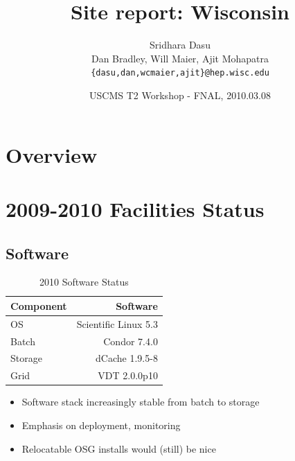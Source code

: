 \documentclass{beamer}
\title{Site report: Wisconsin}
\author[Maier]{
	Sridhara Dasu \\
	Dan Bradley, Will Maier, Ajit Mohapatra
	{\tt \{dasu,dan,wcmaier,ajit\}@hep.wisc.edu}}
\institute[Wisconsin]{University of Wisconsin - High Energy Physics}
\date[2010.03.08]{USCMS T2 Workshop - FNAL, 2010.03.08}
\begin{document}

\begin{frame}
	\titlepage
\end{frame}

\section{Overview}
\begin{frame}
	\tableofcontents
\end{frame}

\section{2009-2010 Facilities Status}
\subsection{Software}
\begin{frame}
\begin{table}
\begin{tabular}{lr}
	\toprule
	Component	 	&	 Software \\
	\midrule
	OS					&	 Scientific Linux 5.3 \\
	Batch			 	&	 Condor 7.4.0 \\
	Storage		 	&	 dCache 1.9.5-8 \\
	Grid				&	 VDT 2.0.0p10 \\
	\bottomrule
\end{tabular}
\caption{2010 Software Status}
\label{2010_software_status}
\end{table}

\begin{itemize}
	\item Software stack increasingly stable from batch to storage
	\item Emphasis on deployment, monitoring
	\item Relocatable OSG installs would (still) be nice
\end{itemize}

\end{frame}
\end{document}
